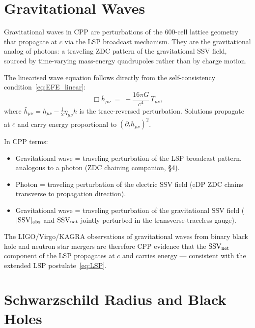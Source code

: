 \documentclass[12pt]{article}
\newcommand{\SSV}{\text{SSV}}
\begin{document}
\section{Gravitational Waves}
\label{sec:GW}

Gravitational waves in CPP are perturbations of the 600-cell lattice
geometry that propagate at $c$ via the LSP broadcast mechanism.  They
are the gravitational analog of photons: a traveling ZDC pattern of the
gravitational SSV field, sourced by time-varying mass-energy quadrupoles
rather than by charge motion.

The linearised wave equation follows directly from the self-consistency
condition~\eqref{eq:EFE_linear}:
\begin{equation}
  \Box\bar{h}_{\mu\nu} \;=\; -\frac{16\pi G}{c^4}\,T_{\mu\nu},
  \label{eq:GW}
\end{equation}
where $\bar{h}_{\mu\nu} = h_{\mu\nu} - \frac{1}{2}\eta_{\mu\nu}h$ is the
trace-reversed perturbation.  Solutions propagate at $c$ and carry energy
proportional to $(\partial_t h_{\mu\nu})^2$.

In CPP terms:
\begin{itemize}[noitemsep]
  \item Gravitational wave = traveling perturbation of the LSP broadcast
    pattern, analogous to a photon (ZDC chaining companion, \S4).
  \item Photon = traveling perturbation of the electric SSV field
    (eDP ZDC chains transverse to propagation direction).
  \item Gravitational wave = traveling perturbation of the gravitational
    SSV field ($|\SSV|_{\rm abs}$ and $\mathbf{\SSV}_{\rm net}$ jointly
    perturbed in the transverse-traceless gauge).
\end{itemize}

The LIGO/Virgo/KAGRA observations of gravitational waves from binary black
hole and neutron star mergers are therefore CPP evidence that the
$\mathbf{\SSV}_{\rm net}$ component of the LSP propagates at $c$ and
carries energy --- consistent with the extended LSP
postulate~\eqref{eq:LSP}.

\section{Schwarzschild Radius and Black Holes}
\label{sec:BH}
\end{document}
